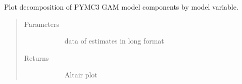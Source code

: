 \documentclass[letterpaper,10pt,english]{sphinxmanual}
\begin{document}

\begin{fulllineitems}
\label{\detokenize{autoapi/src/plot/altair/index:src.plot.altair.plot_decompose}}
Plot decomposition of PYMC3 GAM model components by model variable.
\begin{quote}\begin{description}
\item[{Parameters}] \leavevmode\begin{description}
\item[{}] \leavevmode{[}\sphinxcode{\sphinxupquote{pd.DataFrame}}{]}
data of estimates in long format

\end{description}

\item[{Returns}] \leavevmode\begin{description}
\item[{}] \leavevmode
Altair plot

\end{description}

\end{description}\end{quote}

\end{fulllineitems}

\end{document}
